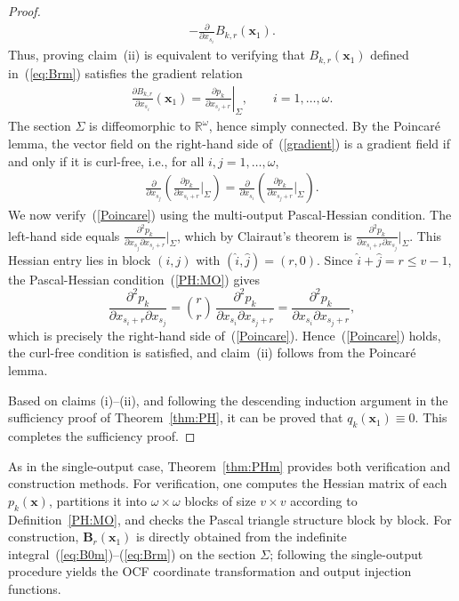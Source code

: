 \documentclass[11pt]{article}
\begin{document}
\begin{proof}
\begin{align}
		-\frac{\partial}{\partial x_{s_i}}B_{k,r}(\bm{x}_1).
	\end{align}
	Thus, proving claim~(ii) is equivalent to verifying that $B_{k,r}(\bm{x}_1)$ defined in~(\ref{eq:Brm}) satisfies the gradient relation
	\begin{align}
		\frac{\partial B_{k,r}}{\partial x_{s_i}}(\bm{x}_1)
		=\left.\frac{\partial p_k}{\partial x_{s_i+r}}\right|_\Sigma,\qquad i=1,\ldots,\omega. \label{gradient}
	\end{align}
	The section $\Sigma$ is diffeomorphic to $\mathbb{R}^\omega$, hence simply connected. By the Poincar\'e lemma, the vector field on the right-hand side of~(\ref{gradient}) is a gradient field if and only if it is curl-free, i.e., for all $i,j=1,\ldots,\omega$,
	\begin{align}
		\frac{\partial}{\partial x_{s_j}}\!\left(\frac{\partial p_k}{\partial x_{s_i+r}}\Big|_\Sigma\right)
		=\frac{\partial}{\partial x_{s_i}}\!\left(\frac{\partial p_k}{\partial x_{s_j+r}}\Big|_\Sigma\right). \label{Poincare}
	\end{align}
	We now verify~(\ref{Poincare}) using the multi-output Pascal-Hessian condition. The left-hand side equals $\frac{\partial^2 p_k}{\partial x_{s_j}\partial x_{s_i+r}}\big|_\Sigma$, which by Clairaut's theorem is $\frac{\partial^2 p_k}{\partial x_{s_i+r}\partial x_{s_j}}\big|_\Sigma$. This Hessian entry lies in block $(i,j)$ with $(\hat{i},\hat{j})=(r,0)$. Since $\hat{i}+\hat{j}=r\leq v-1$, the Pascal-Hessian condition~(\ref{PH:MO}) gives
	\[
	\frac{\partial^2 p_k}{\partial x_{s_i+r}\partial x_{s_j}}
	=\binom{r}{r}\,\frac{\partial^2 p_k}{\partial x_{s_i}\partial x_{s_j+r}}
	=\frac{\partial^2 p_k}{\partial x_{s_i}\partial x_{s_j+r}},
	\]
	which is precisely the right-hand side of~(\ref{Poincare}). Hence~(\ref{Poincare}) holds, the curl-free condition is satisfied, and claim~(ii) follows from the Poincar\'e lemma.
	
	Based on claims (i)--(ii), and following the descending induction argument in the sufficiency proof of Theorem~\ref{thm:PH}, it can be proved that $q_k(\bm{x}_1)\equiv0$. This completes the sufficiency proof.
\end{proof}

As in the single-output case, Theorem~\ref{thm:PHm} provides both verification and construction methods. For verification, one computes the Hessian matrix of each $p_k(\bm{x})$, partitions it into $\omega\times\omega$ blocks of size $v\times v$ according to Definition~\ref{PH:MO}, and checks the Pascal triangle structure block by block. For construction, $\bm{B}_r(\bm{x}_1)$ is directly obtained from the indefinite integral~(\ref{eq:B0m})--(\ref{eq:Brm}) on the section $\Sigma$; following the single-output procedure yields the OCF coordinate transformation and output injection functions.
\end{document}
